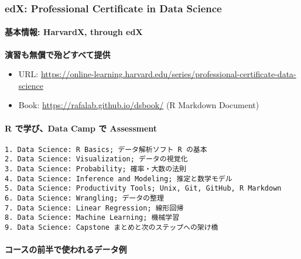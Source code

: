 \documentclass[
]{bxjsbook}
\providecommand{\tightlist}{%
  \setlength{\itemsep}{0pt}\setlength{\parskip}{0pt}}
\theoremstyle{definition}
\theoremstyle{definition}
\theoremstyle{definition}
\theoremstyle{definition}
\theoremstyle{remark}
\begin{document}
\hypertarget{edx-professional-certificate-in-data-science}{%
\subsubsection{edX: Professional Certificate in Data Science}\label{edx-professional-certificate-in-data-science}}

\hypertarget{ux57faux672cux60c5ux5831-harvardx-through-edx}{%
\paragraph{基本情報: HarvardX, through edX}\label{ux57faux672cux60c5ux5831-harvardx-through-edx}}

\textbf{演習も無償で殆どすべて提供}

\begin{itemize}
\tightlist
\item
  URL: \url{https://online-learning.harvard.edu/series/professional-certificate-data-science}
\item
  Book: \url{https://rafalab.github.io/dsbook/} (R Markdown Document)
\end{itemize}

\hypertarget{r-ux3067ux5b66ux3073data-camp-ux3067-assessment}{%
\paragraph{R で学び、Data Camp で Assessment}\label{r-ux3067ux5b66ux3073data-camp-ux3067-assessment}}

\begin{verbatim}
1. Data Science: R Basics; データ解析ソフト R の基本
2. Data Science: Visualization; データの視覚化
3. Data Science: Probability; 確率・大数の法則
4. Data Science: Inference and Modeling; 推定と数学モデル
5. Data Science: Productivity Tools; Unix, Git, GitHub, R Markdown 
6. Data Science: Wrangling; データの整理
7. Data Science: Linear Regression; 線形回帰
8. Data Science: Machine Learning; 機械学習
9. Data Science: Capstone まとめと次のステップへの架け橋
\end{verbatim}

\hypertarget{ux30b3ux30fcux30b9ux306eux524dux534aux3067ux4f7fux308fux308cux308bux30c7ux30fcux30bfux4f8b}{%
\paragraph{コースの前半で使われるデータ例}\label{ux30b3ux30fcux30b9ux306eux524dux534aux3067ux4f7fux308fux308cux308bux30c7ux30fcux30bfux4f8b}}
\end{document}
